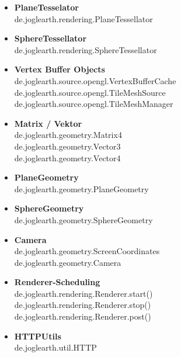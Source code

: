 \documentclass[10pt]{scrreprt}
\begin{document}
\begin{itemize}
\item \textbf{PlaneTesselator}\\
de.joglearth.rendering.PlaneTessellator
\item \textbf{SphereTessellator}\\
de.joglearth.rendering.SphereTessellator
\item \textbf{Vertex Buffer Objects}\\
de.joglearth.source.opengl.VertexBufferCache\\
de.joglearth.source.opengl.TileMeshSource\\
de.joglearth.source.opengl.TileMeshManager
\item \textbf{Matrix / Vektor}\\
de.joglearth.geometry.Matrix4\\
de.joglearth.geometry.Vector3\\
de.joglearth.geometry.Vector4\\
\item \textbf{PlaneGeometry}\\
de.joglearth.geometry.PlaneGeometry
\item \textbf{SphereGeometry}\\
de.joglearth.geometry.SphereGeometry
\item \textbf{Camera}\\
de.joglearth.geometry.ScreenCoordinates\\
de.joglearth.geometry.Camera
\item \textbf{Renderer-Scheduling}\\
de.joglearth.rendering.Renderer.start()\\
de.joglearth.rendering.Renderer.stop()\\
de.joglearth.rendering.Renderer.post()
\item \textbf{HTTPUtils}\\
de.joglearth.util.HTTP
\end{itemize}
\end{document}
